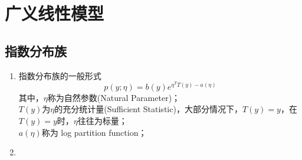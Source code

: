 \section{广义线性模型}
\subsection{指数分布族}
\begin{enumerate}
	\item 指数分布族的一般形式
	\begin{equation}
		p(y;\eta) = b(y)e^{\eta^T T(y) - a(\eta)}
	\end{equation}
	其中，$\eta$称为自然参数(Natural Parameter)； \\
	$T(y)$为$\eta${\color{red}{（应该是$\eta$，因为指数分布族的参数只有$\eta$，但正确与否待确认）}}的充分统计量(Sufficient Statistic)，大部分情况下，$T(y) = y$，在$T(y)=y$时，$\eta$往往为标量； \\
	$a(\eta)$称为 log partition function；
	\item 
\end{enumerate}

